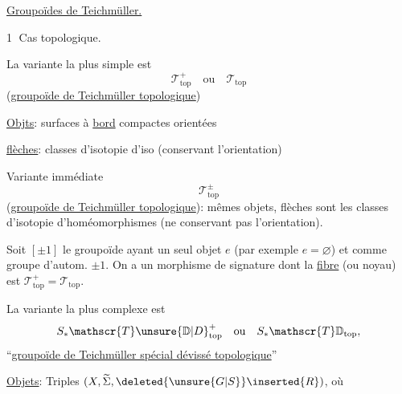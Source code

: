 \uline{Groupoïdes de Teichmüller.}

\textcircled{1} Cas topologique.

La variante la plus simple est
\[
\mathscr{T}_{\mathrm{top}}^{+}\quad\text{ou}\quad\mathscr{T}_{\mathrm{top}}
\]
(\uline{groupoïde de Teichmüller  topologique})


\uline{Objts}: surfaces à \uline{bord} compactes orientées

\uline{flèches}: classes d'isotopie d'iso (conservant l'orientation)

Variante immédiate
\[
\mathscr{T}_{\mathrm{top}}^{\pm}
\]
(\uline{groupoïde de Teichmüller  topologique}): mêmes objets, flèches sont les classes d'isotopie d'homéomorphismes (ne conservant pas  l'orientation).

Soit $[\pm1]$ le groupoïde ayant un seul objet $e$ (par exemple $e=\varnothing$) et comme groupe d'autom. $\pm1$. On a un morphisme de signature
dont la \uline{fibre}  (ou noyau) est $\mathscr{T}_{\mathrm{top}}^{+}=\mathscr{T}_{\mathrm{top}}$.


La variante la plus complexe est
\[
S_{*}\mathscr{T}\unsure{\mathbb{D}|D}_{\mathrm{top}}^{+}\quad\text{ou}\quad S_{*}\mathscr{T}\mathbb{D}_{\mathrm{top}},
\]
``\uline{groupoïde de Teichmüller  spécial dévissé topologique}''


\uline{Objets}: Triples $(X,\widetilde\Sigma,\deleted{\unsure{G|S}}\inserted{R})$, où

